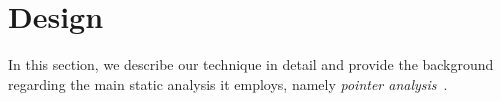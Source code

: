 
\chapter{Design}\label{chapter:design}

In this section, we describe our technique in detail and provide the
background regarding the main static analysis it employs, namely
\emph{pointer analysis}~\cite{andersen:pointeranalysis,
  Hind:Paste2001, Smaragdakis:FTPL2015}.













